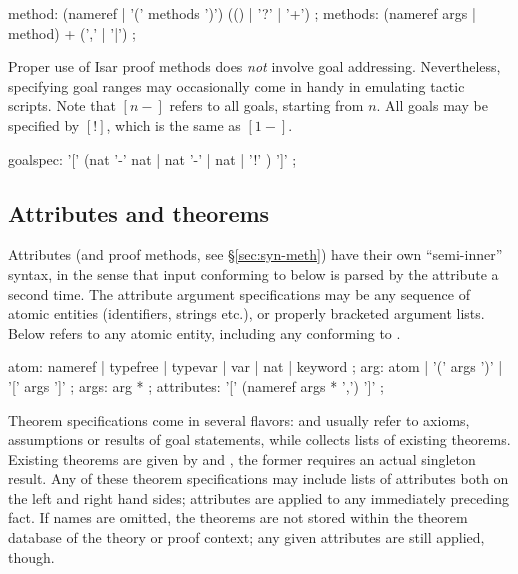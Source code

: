 \begin{rail}
  method: (nameref | '(' methods ')') (() | '?' | '+')
  ;
  methods: (nameref args | method) + (',' | '|')
  ;
\end{rail}

Proper use of Isar proof methods does \emph{not} involve goal addressing.
Nevertheless, specifying goal ranges may occasionally come in handy in
emulating tactic scripts.  Note that $[n-]$ refers to all goals, starting from
$n$.  All goals may be specified by $[!]$, which is the same as $[1-]$.

\begin{rail}
  goalspec: '[' (nat '-' nat | nat '-' | nat | '!' ) ']'
  ;
\end{rail}


\subsection{Attributes and theorems}\label{sec:syn-att}

Attributes (and proof methods, see \S\ref{sec:syn-meth}) have their own
``semi-inner'' syntax, in the sense that input conforming to
 below is parsed by the attribute a second time.  The
attribute argument specifications may be any sequence of atomic entities
(identifiers, strings etc.), or properly bracketed argument lists.  Below
 refers to any atomic entity, including any 
conforming to .

\begin{rail}
  atom: nameref | typefree | typevar | var | nat | keyword
  ;
  arg: atom | '(' args ')' | '[' args ']'
  ;
  args: arg *
  ;
  attributes: '[' (nameref args * ',') ']'
  ;
\end{rail}

Theorem specifications come in several flavors:  and
 usually refer to axioms, assumptions or results of goal
statements, while  collects lists of existing theorems.
Existing theorems are given by  and ,
the former requires an actual singleton result.  Any of these theorem
specifications may include lists of attributes both on the left and right hand
sides; attributes are applied to any immediately preceding fact.  If names are
omitted, the theorems are not stored within the theorem database of the theory
or proof context; any given attributes are still applied, though.

